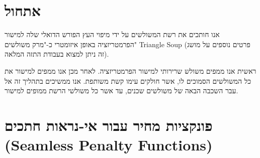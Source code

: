 \documentclass{article}
\begin{document}
\section{אתחול}
אנו חותכים את רשת המשולשים על ידי מיפוי העץ הפורש הדואלי שלה למישור הפרמטריזציה באופן איזומטרי כ-"מרק משולשים"
\foreignlanguage{english}{Triangle Soup}
(פרטים נוספים על מושג זה ניתן למצוא בעבודת התזה המלאה).

ראשית אנו ממפים משולש שרירותי למישור הפרמטריזציה. לאחר מכן אנו ממפים למישור את כל המשולשים הסמוכים לו, אשר חולקים עימו קשת משותפת. אנו ממשיכים בתהליך זה אל עבר השכבה הבאה של משולשים שכנים, עד אשר כל משולשי הרשת ממופים למישור.

\section{
פונקציות מחיר
עבור אי-נראות
חתכים
\foreignlanguage{english}{(Seamless Penalty Functions)}
}



\end{document}
